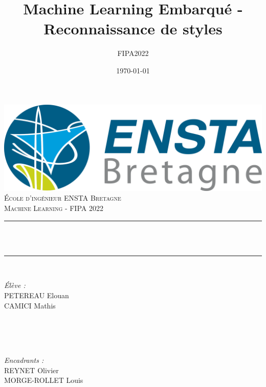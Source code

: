 \documentclass[10pt]{article}
\title{Machine Learning Embarqué - Reconnaissance de styles}		%
\author{FIPA2022}								%
\date{\today}									%
\makeatletter
\let\thetitle\@title
\let\thedate\@date
\makeatother
\begin{document}

\begin{titlepage}
	\centering
    \vspace*{0.5 cm}
    \includegraphics[scale = 0.75]{logo_ensta.png}\\[1.0 cm]	
    \textsc{\LARGE \newline\newline École d'ingénieur ENSTA Bretagne}\\[2.0 cm]	%
	\textsc{\Large Machine Learning - FIPA 2022}\\[0.5 cm]				            %
	\rule{\linewidth}{0.2 mm} \\[0.4 cm]
	{ \huge \bfseries \thetitle}\\
	\rule{\linewidth}{0.2 mm} \\[1.5 cm]
	
	\begin{minipage}{0.5\textwidth}
        \begin{flushleft} \large
            \emph{Élève :} \\
			PETEREAU Elouan\\
			CAMICI Mathis\\
            \ \\
            \ \\
			
			\end{flushleft}
			\end{minipage}~
			\begin{minipage}{0.4\textwidth}
            
			\begin{flushright} \large
                \emph{Encadrants :}\\
                REYNET Olivier\\
                MORGE-ROLLET Louis\\
                \ \\
                \ \\
                
		\end{flushright}
        
	\end{minipage}\\[2 cm]
	
	
    \thedate
    
    
    
	
\end{titlepage}
\setlength\parindent{9pt}
\end{document}
